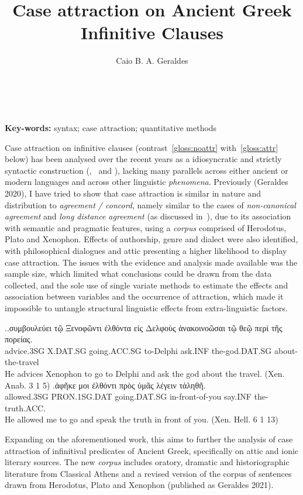 \documentclass[article,a4paper,12pt]{memoir}
\title{Case attraction on Ancient Greek Infinitive Clauses}
\author{Caio B. A. Geraldes}
\begin{document}
\begin{center}
  {\large\textbf{\thetitle}}\\
  \bigskip
  \theauthor\\
  \bigskip
\noindent\textbf{Key-words:} syntax; case attraction; quantitative methods
\end{center}
  
Case attraction on infinitive clauses (contrast~\autoref{gloss:noattr}
with~\autoref{gloss:attr} below) has
been analysed over the recent years as a idiosyncratic and strictly
syntactic construction (\cite{Tantalou2003},~\cite{Spyropoulos2005} and 
\cites{Sevdali2013b}{Sevdali2013}), lacking many parallels across either 
ancient or modern languages and across other linguistic \emph{phenomena}. 
Previously (Geraldes 2020), I have tried to show that case attraction is 
similar in nature and distribution to \emph{agreement / concord}, namely 
similar to the cases of \emph{non-canonical agreement} and \emph{long 
distance agreement} (as discussed in~\cite{Corbett2006}), due to its 
association with semantic and pragmatic features, using a \emph{corpus} 
comprised of Herodotus, Plato and Xenophon. Effects of authorship, genre and 
dialect were also identified, with philosophical dialogues and attic presenting
a higher likelihood to display case attraction. The issues with the
evidence and analysis made available was the sample size, which limited
what conclusions could be drawn from the data collected, and the sole
use of single variate methods to estimate the effects and association
between variables and the occurrence of attraction, which made it
impossible to untangle structural linguistic effects from
extra-linguistic factors.


\ex.\ag.\label{gloss:noattr}συμβουλεύει {τῷ Ξενοφῶντι} ἐλθόντα {εἰς Δελφοὺς} ἀνακοινοῶσαι {τῷ θεῷ} {περὶ τῆς πορείας}.\\
  advice.3SG X.DAT.SG going.ACC.SG to-Delphi ask.INF the-god.DAT.SG
  about-the-travel\\
  He advices Xenophon to go to Delphi and ask the god about the travel.
  (Xen. Anab. 3 1 5)
\bg.\label{gloss:attr}ἀφῆκε μοι ἐλθόντι {πρὸς ὑμᾶς} λέγειν τἀληθῆ.\\
  allowed.3SG PRON.1SG.DAT going.DAT.SG in-front-of-you say.INF
  the-truth.ACC.\\
  He allowed me to go and speak the truth in front of you. (Xen. Hell. 6
  1 13)


Expanding on the aforementioned work, this aims to further the analysis
of case attraction of infinitival predicates of Ancient Greek,
specifically on attic and ionic literary sources. The new \emph{corpus}
includes oratory, dramatic and historiographic literature from Classical
Athens and a revised version of the corpus of sentences drawn from
Herodotus, Plato and Xenophon (published as Geraldes 2021).
\end{document}
